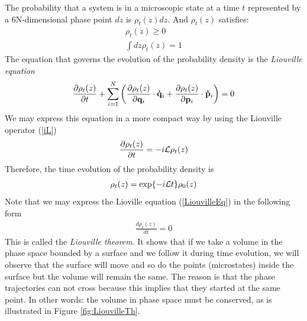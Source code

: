 \documentclass[b5paper,openright,10pt]{book}
\begin{document}
The probability that a system is in a microscopic state at a time $t$ represented by a 6N-dimensional phase point $dz$ is $\rho_t(z)dz$. And $\rho_t(z)$ satisfies:
%
\begin{align}
    \rho_t(z) \geq 0  \nonumber \\
    \int dz\rho_t(z) = 1
\end{align}
%
The equation that governs the evolution of the probability density is the {\it Liouville equation}
\begin{align}
    \frac{\partial\rho_t(z)}{\partial t} + \sum_{i=1}^N\left(\frac{\partial\rho_t(z)}{\partial{\bf q}_i}\cdot{\bf \dot{q}}_i+\frac{\partial\rho_t(z)}{\partial{\bf p}_i}\cdot{\bf \dot{p}}_i\right) = 0
\end{align}
We may express this equation in a more compact way by using the Liouville operator (\ref{iL}) 
\begin{align}
    \frac{\partial\rho_t(z)}{\partial t} = -i{\cal L}\rho_t(z)
    \label{LiouvilleEq}
  \end{align}
Therefore, the time evolution of the probability density is
\begin{align}
    \rho_t(z) = {\rm exp}\{-i{\cal L}t\}\rho_0(z)
    \label{rhot}
\end{align}
Note that we may express the Lioville equation (\ref{LiouvilleEq}) in the following form
\begin{align}
    \frac{d\rho_t(z)}{dt} = 0 
    \label{LiouvilleTh}
\end{align}
This is called the {\it Liouville theorem}. It shows that if we take a volume in the phase space bounded by a surface and we follow it during time evolution, we will observe that the surface will move and so do the points (microstates) inside the surface but the volume will remain the same. The reason is that the phase trajectories can not cross because this implies that they started at the same point. In other words: the volume in phase space must be conserved, as is illustrated in Figure \ref{fig:LiouvilleTh}.
\end{document}
